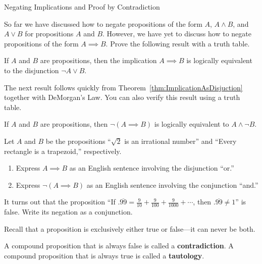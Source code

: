 \begin{section}{Negating Implications and Proof by Contradiction}

So far we have discussed how to negate propositions of the form $A$, $A\wedge B$, and $A\vee B$ for propositions $A$ and $B$.  However, we have yet to discuss how to negate propositions of the form $A\implies B$.  Prove the following result with a truth table.

\begin{theorem}\label{thm:ImplicationAsDisjuction}
If $A$ and $B$ are propositions, then the implication $A\implies B$ is logically equivalent to the disjunction $\neg A \vee B$.
\end{theorem}

The next result follows quickly from Theorem~\ref{thm:ImplicationAsDisjuction} together with DeMorgan's Law. You can also verify this result using a truth table.

\begin{corollary}\label{cor:NegateImplication}
If $A$ and $B$ are propositions, then $\neg(A \implies B)$ is logically equivalent to $A \wedge \neg B$.
\end{corollary}

\begin{problem}\label{prob:Darth Vader}
Let $A$ and $B$ be the propositions ``$\sqrt{2}$ is an irrational number'' and ``Every rectangle is a trapezoid,'' respectively.
\begin{enumerate}[label=\textrm{(\alph*)}]
\item Express $A\implies B$ as an English sentence involving the disjunction ``or.''
\item Express $\neg(A\implies B)$ as an English sentence involving the conjunction ``and.''
\end{enumerate}
\end{problem}

\begin{problem}
It turns out that the proposition ``If $.\overline{99}=\frac{9}{10}+\frac{9}{100}+\frac{9}{1000}+\cdots$, then $.\overline{99}\neq 1$'' is false. Write its  negation as a conjunction.
\end{problem}

Recall that a proposition is exclusively either true or false---it can never be both.

\begin{definition}
A compound proposition that is always false is called a \textbf{contradiction}.  A compound proposition that is always true is called a \textbf{tautology}.
\end{definition}


\end{section}
